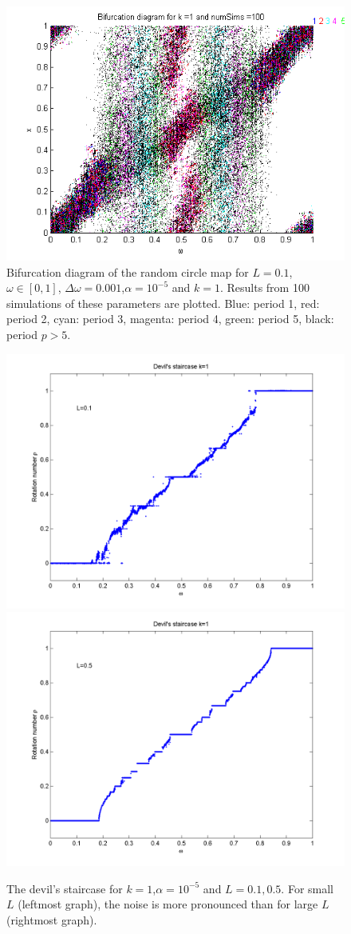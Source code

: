 \begin{figure}[!h]
\caption[Bifurcation diagram of the random
circle map]{Bifurcation diagram of the random
circle map for $L=0.1$, $\omega \in [0,1]$, $\Delta \omega = 0.001$,$\alpha = 10^{-5}$
and $k=1$. Results from 100 simulations of these parameters are
plotted. Blue: period 1, red:
period 2, cyan: period 3, magenta: period 4, green: period 5, black:
period $p > 5$.} 
	\begin{center}
		\includegraphics[scale=0.7]{figs/rcirc_bif_L01_k1.png}
	\end{center}
\end{figure}

\begin{figure}[htp]
\caption[The devil's staircase for the random circle map]{The devil's
  staircase for $k=1$,$\alpha = 10^{-5}$ and $L = 0.1,0.5$. For small $L$
  (leftmost graph), the noise is more pronounced than for large $L$
  (rightmost graph).}\label{fig:randdevil1}
\centering
\includegraphics[width=.5\textwidth]{figs/rdevil_k1_L01.png}\hfill
\includegraphics[width=.5\textwidth]{figs/rdevil_k1_L05.png}
\end{figure}

